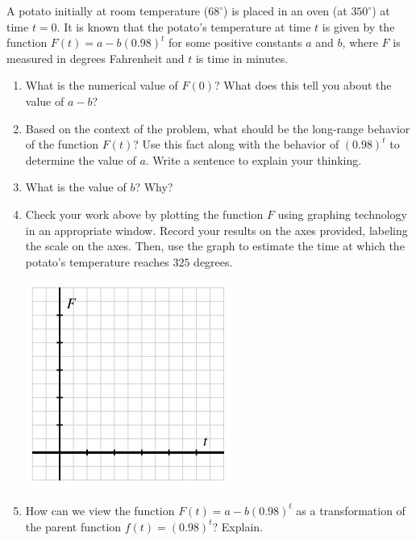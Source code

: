 \documentclass[nooutcomes]{ximera}
\begin{document}
\begin{exploration}
A potato initially at room temperature (\(68^\circ\)) is placed in an oven (at \(350^\circ\)) at time \(t = 0\). It is known that the potato's temperature at time \(t\) is given by the function \(F(t) = a - b(0.98)^t\) for some positive constants \(a\) and \(b\), where \(F\) is measured in degrees Fahrenheit and \(t\) is time in minutes.

\begin{enumerate}[label=\alph*.]
\item What is the numerical value of \(F(0)\)? What does this tell you about the value of \(a - b\)?
\item Based on the context of the problem, what should be the long-range behavior of the function \(F(t)\)? Use this fact along with the behavior of \((0.98)^t\) to determine the value of \(a\).  Write a sentence to explain your thinking.
\item What is the value of \(b\)?  Why?%
\item Check your work above by plotting the function \(F\) using graphing technology in an appropriate window. Record your results on the axes provided, labeling the scale on the axes. Then, use the graph to estimate the time at which the potato's temperature reaches \(325\) degrees.
\begin{image}
\includegraphics{ExpText11.jpg}
\end{image}
\item How can we view the function \(F(t) = a - b(0.98)^t\) as a transformation of the parent function \(f(t) = (0.98)^t\)?  Explain.
\end{enumerate}
\end{exploration}
\end{document}
